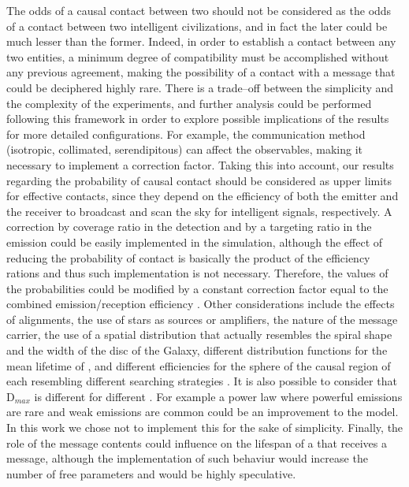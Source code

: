 The odds of a causal contact between two \cetis{} should not be
considered as the odds of a contact between two intelligent
civilizations, and in fact the later could be much lesser than the
former.
%
Indeed, in order to establish a contact between any two entities, a
minimum degree of compatibility must be accomplished without any
previous agreement, making the possibility of a contact with a message
that could be deciphered highly rare.
%
There is a trade--off between the simplicity and the complexity of the
experiments, and further analysis could be performed following this
framework in order to explore possible implications of the results for
more detailed configurations.
%
For example, the communication method (isotropic, collimated,
serendipitous) can affect the observables, making it necessary to
implement a correction factor.
%
Taking this into account, our results regarding the probability of
causal contact should be considered as upper limits for effective
contacts, since they depend on the efficiency of both the emitter and
the receiver to broadcast and scan the sky for intelligent signals,
respectively.
%
A correction by coverage ratio in the detection and by a targeting
ratio in the emission could be easily implemented in the simulation,
although the effect of reducing the probability of contact is
basically the product of the efficiency rations and thus such
implementation is not necessary.
%
Therefore, the values of the probabilities could be modified by a
constant correction factor equal to the combined emission/reception
efficiency \citep{smith_broadcasting_2009, anchordoqui_upper_2019,
forgan_collimated_2014}.
%
Other considerations include the effects of alignments, the use of
stars as sources or amplifiers, the nature of the message carrier, the
use of a spatial distribution that actually resembles the spiral shape
and the width of the disc of the Galaxy, different distribution
functions for the mean lifetime of \cetis{}, and different
efficiencies for the sphere of the causal region of each \ceti{}
resembling different searching strategies
\citep{hippke_interstellar_2017}.
%
It is also possible to consider that D$_{max}$ is different for
different \cetis{}.  For example a power law where powerful emissions
are rare and weak emissions are common could be an improvement to the
model.
%
In this work we chose not to implement this for the sake of
simplicity.
%
Finally, the role of the message contents could influence on the
lifespan of a \ceti{} that receives a message, although the
implementation of such behaviur would increase the number of free
parameters and would be highly speculative.
 

